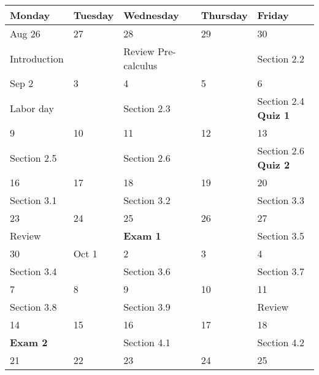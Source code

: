 \documentclass[12pt]{amsart}
\begin{document}
\begin {enumerate}
\begin{center}
\begin{tabular}{ |m{7em}|m{5em}|m{7em}|m{5em}|m{7em}|}
 \hline
Monday & Tuesday & Wednesday & Thursday & Friday \\ 
\hline
\multicolumn {1}{|l|}{Aug 26} & \multicolumn {1}{l|}{27} & \multicolumn {1}{l|}{28}  & \multicolumn {1}{l|}{29} &\multicolumn {1}{l|}{30}  \\ 
  Introduction & & Review Pre-calculus &   & Section 2.2  \\
\hline
\multicolumn {1}{|l|}{ Sep 2} & \multicolumn {1}{l|}{3} & \multicolumn {1}{l|}{4}  & \multicolumn {1}{l|}{5} &\multicolumn {1}{l|}{6}  \\
 Labor day&  & Section 2.3 &  & Section 2.4 {\bf Quiz 1} \\
\hline
\multicolumn {1}{|l|}{9} & \multicolumn {1}{l|}{10} & \multicolumn {1}{l|}{11}  & \multicolumn {1}{l|}{12} &\multicolumn {1}{l|}{13}  \\
Section 2.5 &  &Section 2.6 & &  Section 2.6 {\bf Quiz 2} \\
\hline
\multicolumn {1}{|l|}{16} & \multicolumn {1}{l|}{17} & \multicolumn {1}{l|}{18}  & \multicolumn {1}{l|}{19} &\multicolumn {1}{l|}{20}  \\
 Section 3.1  & & Section 3.2 &  &  Section 3.3 \\
\hline 
\multicolumn {1}{|l|}{23} & \multicolumn {1}{l|}{24} & \multicolumn {1}{l|}{25}  & \multicolumn {1}{l|}{26} &\multicolumn {1}{l|}{27}  \\
Review & & {\bf Exam 1}  &  & Section 3.5   \\ 
\hline
\multicolumn {1}{|l|}{30} & \multicolumn {1}{l|}{Oct 1} & \multicolumn {1}{l|}{2}  & \multicolumn {1}{l|}{3} &\multicolumn {1}{l|}{4}  \\
Section 3.4 &  & Section 3.6 & & Section 3.7 \\
\hline 
\multicolumn {1}{|l|}{7} & \multicolumn {1}{l|}{8} & \multicolumn {1}{l|}{9}  & \multicolumn {1}{l|}{10} &\multicolumn {1}{l|}{11}  \\
Section 3.8 & &Section 3.9   &  & Review \\ 
\hline
\multicolumn {1}{|l|}{14} & \multicolumn {1}{l|}{15} & \multicolumn {1}{l|}{16}  & \multicolumn {1}{l|}{17} &\multicolumn {1}{l|}{18}  \\
{\bf Exam 2} & & Section 4.1 &  & Section 4.2  \\
\hline
\multicolumn {1}{|l|}{21} & \multicolumn {1}{l|}{22} & \multicolumn {1}{l|}{23}  & \multicolumn {1}{l|}{24} &\multicolumn {1}{l|}{25}  \\

\end{tabular}
\end{center}
\end{enumerate}
\end{document}
